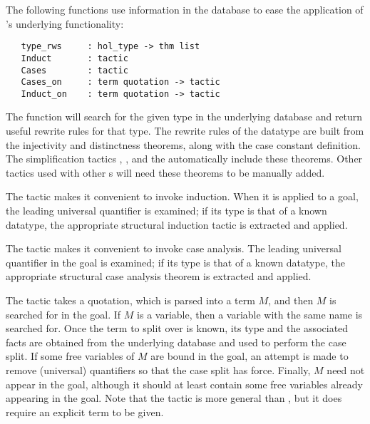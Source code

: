 {The following functions use information in the database to ease the
application of \HOL's underlying functionality:

\begin{verbatim}
   type_rws     : hol_type -> thm list
   Induct       : tactic
   Cases        : tactic
   Cases_on     : term quotation -> tactic
   Induct_on    : term quotation -> tactic
\end{verbatim}

%
The function  will search for the given type in the
underlying  database and return useful rewrite rules for
that type. The rewrite rules of the datatype are built from the
injectivity and distinctness theorems, along with the case constant
definition. The simplification tactics , ,
and the \simpset{}  automatically include these
theorems.  Other tactics used with other \simpset{}s will need these
theorems to be manually added.

%
The  tactic makes it convenient to invoke induction. When
it is applied to a goal, the leading universal quantifier is examined;
if its type is that of a known datatype, the appropriate structural
induction tactic is extracted and applied.

The  tactic makes it convenient to invoke case
analysis. The leading universal quantifier in the goal is examined; if
its type is that of a known datatype, the appropriate structural
case analysis theorem is extracted and applied.

The  tactic takes a quotation, which is
parsed into a term $M$, and then $M$ is searched for in the goal. If $M$
is a variable, then a variable with the same name is searched for. Once
the term to split over is known, its type and the associated facts are
obtained from the underlying database and used to perform the case
split. If some free variables of $M$ are bound in the goal, an attempt
is made to remove (universal) quantifiers so that the case split has
force. Finally, $M$ need not appear in the goal, although it should at
least contain some free variables already appearing in the goal. Note
that the  tactic is more general than , but
it does require an explicit term to be given.

}

